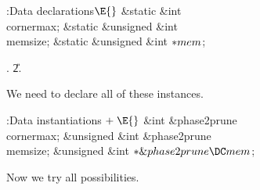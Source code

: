 \Y\B\4:Data declarations\X${}\E{}$\6
\&{static} \&{int} \\{cornermax};\6
\&{static} \&{unsigned} \&{int} \\{memsize};\6
\&{static} \&{unsigned} \&{int} ${}{*}\\{mem}{}$;\par
{}.
\U2.\fi

We need to declare all of these instances.

\Y\B\4:Data instantiations\X${}\mathrel+\E{}$\6
\&{int} \&{phase2prune}\DC\\{cornermax};\6
\&{unsigned} \&{int} \&{phase2prune}\DC\\{memsize};\6
\&{unsigned} \&{int} ${}{*}\&{phase2prune}\DC\\{mem}{}$;\par
\fi

Now we try all possibilities.


